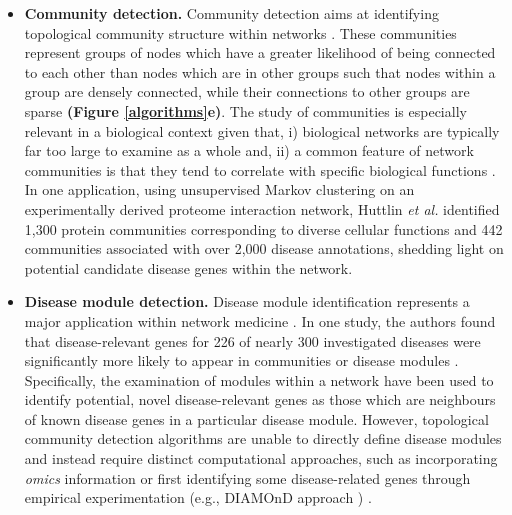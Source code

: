 \begin{itemize}
    \item \textbf{Community detection.} Community detection aims at identifying topological community structure within networks \parencite{liu2020}. These communities represent groups of nodes which have a greater likelihood of being connected to each other than nodes which are in other groups such that nodes within a group are densely connected, while their connections to other groups are sparse \parencite{fortunato2016,girvan2002} \textbf{(Figure \ref{algorithms}e)}. The study of communities is especially relevant in a biological context given that, i) biological networks are typically far too large to examine as a whole and, ii) a common feature of network communities is that they tend to correlate with specific biological functions \parencite{hartwell1999,choobdar2019}. In one application, using unsupervised Markov clustering \parencite{enright2002} on an experimentally derived proteome interaction network, Huttlin \textit{et al.} \parencite{huttlin2017} identified 1,300 protein communities corresponding to diverse cellular functions and 442 communities associated with over 2,000 disease annotations, shedding light on potential candidate disease genes within the network.

    \item \textbf{Disease module detection.} Disease module identification represents a major application within network medicine \parencite{gustafsson2014}. In one study, the authors found that disease-relevant genes for 226 of nearly 300 investigated diseases were significantly more likely to appear in communities or disease modules \parencite{menche2015}. Specifically, the examination of modules within a network have been used to identify potential, novel disease-relevant genes as those which are neighbours of known disease genes in a particular disease module. However, topological community detection algorithms are unable to directly define disease modules and instead require distinct computational approaches, such as incorporating \textit{omics} information or first identifying some disease-related genes through empirical experimentation (e.g., DIAMOnD approach \parencite{ghiassian2015}) \parencite{liu2020}. 


\end{itemize}

